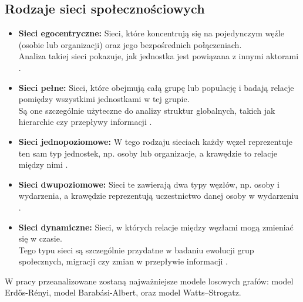 \subsection{Rodzaje sieci społecznościowych}
\begin{itemize}
      \item \textbf{Sieci egocentryczne:} Sieci, które koncentrują się na pojedynczym węźle (osobie lub organizacji) oraz jego bezpośrednich połączeniach.
            \\ Analiza takiej sieci pokazuje, jak jednostka jest powiązana z innymi aktorami \cite{Hanneman2005}.
      \item \textbf{Sieci pełne:} Sieci, które obejmują całą grupę lub populację i badają relacje pomiędzy wszystkimi jednostkami w tej grupie.
            \\ Są one szczególnie użyteczne do analizy struktur globalnych, takich jak hierarchie czy przepływy informacji \cite{Scott2000}.
      \item \textbf{Sieci jednopoziomowe:} W tego rodzaju sieciach każdy węzeł reprezentuje ten sam typ jednostek, np. osoby lub organizacje,
            a krawędzie to relacje między nimi \cite{Newman2010}.
      \item \textbf{Sieci dwupoziomowe:} Sieci te zawierają dwa typy węzłów, np. osoby i wydarzenia, a krawędzie reprezentują uczestnictwo danej osoby w wydarzeniu \cite{Borgatti1997}.
      \item \textbf{Sieci dynamiczne:} Sieci, w których relacje między węzłami mogą zmieniać się w czasie.
            \\ Tego typu sieci są szczególnie przydatne w badaniu ewolucji grup społecznych, migracji czy zmian w przepływie informacji \cite{Holme2012}.
\end{itemize}

W pracy przeanalizowane zostaną najważniejsze modele losowych grafów: model Erdős-Rényi, model Barabási-Albert, oraz model Watts–Strogatz.